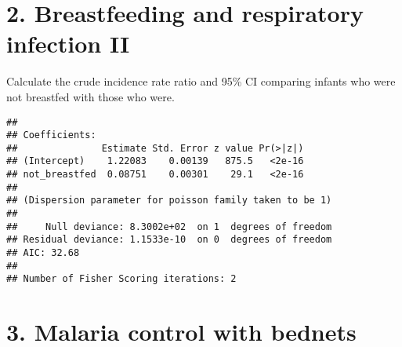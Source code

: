 \documentclass[10pt]{beamer}\usepackage[]{graphicx}\usepackage[]{color}
\makeatletter
\newenvironment{kframe}{%
 \def\at@end@of@kframe{}%
 \ifinner\ifhmode%
  \def\at@end@of@kframe{\end{minipage}}%
  \begin{minipage}{\columnwidth}%
 \fi\fi%
 \def\FrameCommand##1{\hskip\@totalleftmargin \hskip-\fboxsep
 \colorbox{shadecolor}{##1}\hskip-\fboxsep
     \hskip-\linewidth \hskip-\@totalleftmargin \hskip\columnwidth}%
 \MakeFramed {\advance\hsize-\width
   \@totalleftmargin\z@ \linewidth\hsize
   \@setminipage}}%
 {\par\unskip\endMakeFramed%
 \at@end@of@kframe}
\newenvironment{knitrout}{}{} %
\makeatother
\begin{document}
\section{2. Breastfeeding and respiratory infection II}
\begin{frame}
	\vspace*{-1.291in}
	\tiny
Calculate the crude incidence rate ratio and 95\% CI comparing infants who were not breastfed with those who were.
\begin{knitrout}\tiny
{}\color{fgcolor}\begin{kframe}
\begin{verbatim}
## 
## Coefficients:
##               Estimate Std. Error z value Pr(>|z|)
## (Intercept)    1.22083    0.00139   875.5   <2e-16
## not_breastfed  0.08751    0.00301    29.1   <2e-16
## 
## (Dispersion parameter for poisson family taken to be 1)
## 
##     Null deviance: 8.3002e+02  on 1  degrees of freedom
## Residual deviance: 1.1533e-10  on 0  degrees of freedom
## AIC: 32.68
## 
## Number of Fisher Scoring iterations: 2
\end{verbatim}
\end{kframe}
\end{knitrout}
	
\end{frame}





\section{3. Malaria control with bednets}
\end{document}
